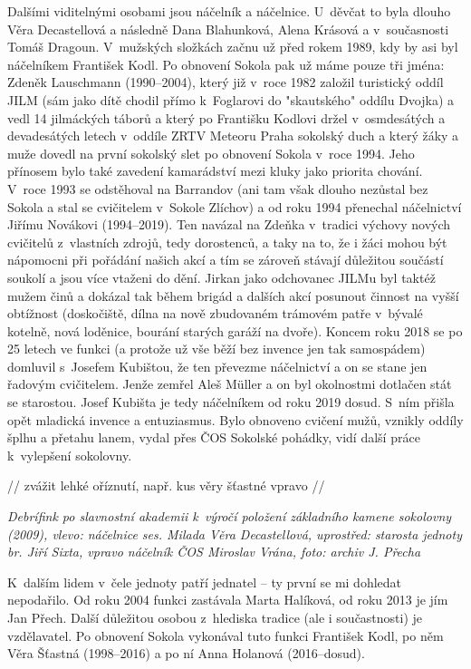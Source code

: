 \documentclass[a5paper, 12pt, twoside]{article}
\begin{document}
Dalšími viditelnými osobami jsou náčelník a náčelnice. U~děvčat to byla
dlouho Věra Decastellová a následně Dana Blahunková, Alena Krásová a
v~současnosti Tomáš Dragoun. V~mužských složkách začnu už před rokem 1989,
kdy by asi byl náčelníkem František Kodl. Po obnovení Sokola pak už máme
pouze tři jména: Zdeněk Lauschmann (1990--2004), který již v~roce 1982
založil turistický oddíl JILM (sám jako dítě chodil přímo k~Foglarovi do
"skautského" oddílu Dvojka) a vedl 14 jilmáckých táborů a který po
Františku Kodlovi držel v~osmdesátých a devadesátých letech v~oddíle
ZRTV Meteoru Praha sokolský duch a který žáky a muže dovedl na první
sokolský slet po obnovení Sokola v~roce 1994. Jeho přínosem bylo také
zavedení kamarádství mezi kluky jako priorita chování. V~roce 1993 se
odstěhoval na Barrandov (ani tam však dlouho nezůstal bez Sokola a stal
se cvičitelem v~Sokole Zlíchov) a od roku 1994 přenechal náčelnictví
Jiřímu Novákovi (1994--2019). Ten navázal na Zdeňka
v~tradici výchovy nových cvičitelů z~vlastních zdrojů, tedy dorostenců, a
taky na to, že i žáci mohou být nápomocni při pořádání našich akcí a tím
se zároveň stávají důležitou součástí soukolí a jsou více vtaženi do
dění. Jirkan jako odchovanec JILMu byl taktéž mužem činů a dokázal tak
během brigád a dalších akcí posunout činnost na vyšší obtížnost
(doskočiště, dílna na nově zbudovaném trámovém patře v~bývalé kotelně,
nová loděnice, bourání starých garáží na dvoře). Koncem roku 2018 se po
25 letech ve funkci (a protože už vše běží bez invence jen tak
samospádem) domluvil s~Josefem Kubištou, že ten převezme náčelnictví a
on se stane jen řadovým cvičitelem. Jenže zemřel Aleš Müller a on byl
okolnostmi dotlačen stát se starostou. Josef Kubišta je tedy náčelníkem
od roku 2019 dosud. S~ním přišla opět mladická invence a entuziasmus.
Bylo obnoveno cvičení mužů, vznikly oddíly šplhu a přetahu lanem, vydal
přes ČOS Sokolské pohádky, vidí další práce k~vylepšení sokolovny.


// zvážit lehké oříznutí, např. kus věry šťastné vpravo //

\textit{Debrífink po slavnostní akademii k~výročí položení základního
kamene sokolovny (2009), vlevo: náčelnice ses. Milada Věra Decastellová,
uprostřed: starosta jednoty br. Jiří Sixta, vpravo náčelník ČOS Miroslav
Vrána, foto: archiv J. Přecha}

K~dalším lidem v~čele jednoty patří jednatel -- ty první se mi dohledat
nepodařilo. Od roku 2004 funkci zastávala Marta Halíková, od roku 2013
je jím Jan Přech. Další důležitou osobou z~hlediska tradice (ale i
součastnosti) je vzdělavatel. Po obnovení Sokola vykonával tuto funkci
František Kodl, po něm Věra Šťastná (1998--2016) a po ní Anna Holanová
(2016--dosud).
\end{document}
